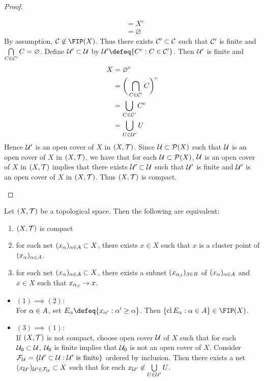 \documentclass{book}
\begin{document}
\begin{proof}
\begin{itemize}
\begin{align*}
				& = X^c \\
				& = \varnothing
			\end{align*}  
			By assumption, $\MC \not \in \FIP(X)$. Thus there exists $\mathcal{C}' \subset \mathcal{C}$ such that $\mathcal{C}'$ is finite and $\bigcap\limits_{C \in \mathcal{C}'} C = \varnothing$. Define $\mathcal{U}' \subset \mathcal{U}$ by $\MU' \defeq \{C^c: C \in \MC' \}$. Then $\mathcal{U}'$ is finite and 
			\begin{align*}
				X
				& = \varnothing^c \\
				& = \bigg( \bigcap_{C \in \mathcal{C}'} C \bigg)^c \\
				& = \bigcup_{C \in \mathcal{C}'} C^c \\
				& = \bigcup_{U \in \mathcal{U}'} U \\
			\end{align*}
			Hence $\mathcal{U}'$ is an open cover of $X$ in $(X, \mathcal{T})$. Since $\mathcal{U} \subset \mathcal{P}(X)$ such that $\mathcal{U}$ is an open cover of $X$ in $(X, \mathcal{T})$, we have that for each $\mathcal{U} \subset \mathcal{P}(X)$, $\mathcal{U}$ is an open cover of $X$ in $(X, \mathcal{T})$ implies that there exists $\mathcal{U}' \subset \mathcal{U}$ such that $\mathcal{U}'$ is finite and $\mathcal{U}'$ is an open cover of $X$ in $(X, \mathcal{T})$. Thus $(X, \mathcal{T})$ is compact. 
			\end{itemize}
	\end{proof}

	\begin{ex}
		Let $(X, \mathcal{T})$ be a topological space. Then the following are equivalent:
		\begin{enumerate}
			\item $(X, \mathcal{T})$ is compact
			\item for each net $(x_{\alpha})_{\alpha \in A} \subset X$, there exists $x \in X$ such that $x$ is a cluster point of $(x_{\alpha})_{\alpha \in A}$.
			\item for each net $(x_{\alpha})_{\alpha \in A} \subset X$, there exists a subnet $(x_{\alpha_{\beta}})_{\beta \in B}$ of $(x_{\alpha})_{\alpha \in A}$ and $x \in X$ such that $x_{\alpha_{\beta}} \rightarrow x$. \\
		\end{enumerate} 
		\begin{itemize}
			\item $(1) \implies (2)$: \\
			For $\alpha \in A$, set $E_{\al} \defeq \{x_{\al'}: \al' \geq \al \}$. Then $\{\cl E_{\al}: \al \in A\} \in \FIP(X)$.  
			\item $(3) \implies (1)$: \\
			If $(X, \mathcal{T})$ is not compact, choose open cover $\mathcal{U}$ of $X$ such that for each $\mathcal{U}_0 \subset \mathcal{U}$, $\mathcal{U}_0$ is finite implies that $\mathcal{U}_0$ is not an open cover of $X$. Consider $\mathcal{F}_{\mathcal{U}} = \{\mathcal{U}' \subset \mathcal{U}: \mathcal{U}' \text{ is finite}\}$ ordered by inclusion. Then there exists a net $(x_{\mathcal{U}'})_{\mathcal{U}' \in \mathcal{F}_{\mathcal{U}}} \subset X$ such that for each $x_{\mathcal{U}'} \not \in  \bigcup\limits_{U \in \mathcal{U}'} U$. 
		\end{itemize}
	\end{ex}
	
\end{document}

